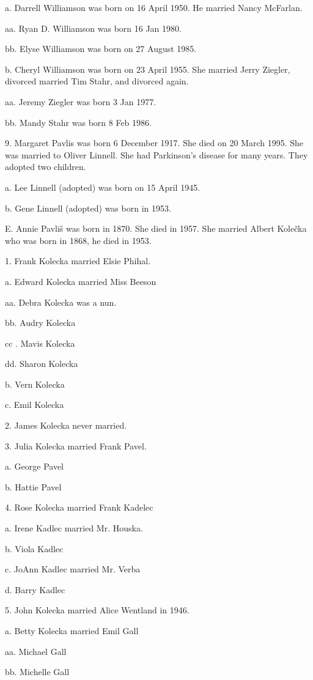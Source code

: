 \documentclass[a4paper]{article}
\begin{document}
a. Darrell Williamson was born on 16 April 1950.  He married Nancy McFarlan.

aa. Ryan D. Williamson was born 16 Jan 1980.

bb. Elyse Williamson was born on 27 August 1985.

b. Cheryl Williamson was born on 23 April 1955.  She married Jerry Ziegler, divorced married Tim Stahr, and divorced again.

aa. Jeremy Ziegler was born 3 Jan 1977.

bb. Mandy Stahr was born 8 Feb 1986.

9. Margaret Pavlis was born 6 December 1917.  She died on 20 March 1995. She was married to Oliver Linnell.  She had Parkinson's disease for many years. They adopted two children.
			
a. Lee Linnell (adopted) was born on 15 April 1945.

b. Gene Linnell (adopted) was born in 1953.   

E. Annie Pavli\v{s} was born in 1870.  She died in 1957.  She married Albert Kole\v{c}ka who was born in 1868, he died in 1953.

1. Frank Kolecka married Elsie Phihal.

a. Edward Kolecka married Miss Beeson

aa. Debra Kolecka was a nun.

bb. Audry Kolecka

cc . Mavis Kolecka

dd. Sharon Kolecka

b. Vern Kolecka

c. Emil Kolecka 

2. James Kolecka never married.

3. Julia Kolecka married Frank Pavel.

a. George Pavel

b. Hattie Pavel

4. Rose Kolecka married Frank Kadelec

a. Irene Kadlec married Mr. Houska.

b. Viola Kadlec

c. JoAnn Kadlec married Mr. Verba

d. Barry Kadlec

5. John Kolecka married Alice Wentland in 1946.  

a. Betty Kolecka married Emil Gall

aa. Michael Gall

bb. Michelle Gall
\end{document}
